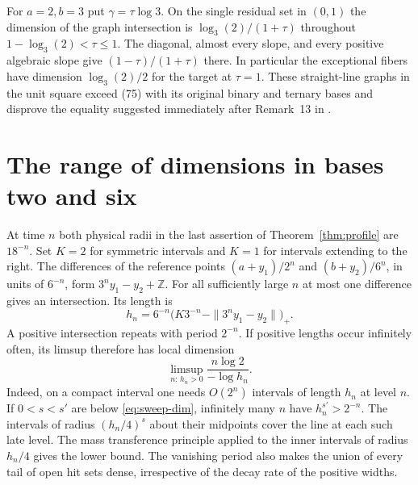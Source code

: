 \documentclass[11pt,reqno,a4paper]{amsart}
\theoremstyle{remark}
\numberwithin{equation}{section}
\begin{document}
For \(a=2,b=3\) put \(\gamma=\tau\log3\). On the single residual set
in \((0,1)\) the dimension of the graph intersection is
\(\log_3(2)/(1+\tau)\) throughout \(1-\log_3(2)<\tau\le1\).
The diagonal, almost every slope, and every positive algebraic slope
give \((1-\tau)/(1+\tau)\) there. In particular the exceptional
fibers have dimension \(\log_3(2)/2\) for the target at \(\tau=1\).
These straight-line graphs in the unit square exceed (75) with
its original binary and ternary bases and disprove the equality
suggested immediately after Remark~13 in \cite[\S5.5, pp.~67--68]{LLVZ}.

\section{The range of dimensions in bases two and six}\label{sec:sweep}
At time \(n\) both physical radii in the last assertion of Theorem~\ref{thm:profile} are \(18^{-n}\). Set \(K=2\) for symmetric intervals and \(K=1\) for intervals extending to the right. The differences of the reference points \((a+y_1)/2^n\) and \((b+y_2)/6^n\), in units of \(6^{-n}\), form \(3^ny_1-y_2+\mathbb Z\). For all sufficiently large \(n\) at most one difference gives an intersection. Its length is
\[
 h_n=6^{-n}\big(K3^{-n}-\|3^ny_1-y_2\|\big)_+.
\]
A positive intersection repeats with period \(2^{-n}\). If positive lengths occur infinitely often, its limsup therefore has local dimension
\begin{equation}\label{eq:sweep-dim}
 \limsup_{n:\, h_n>0}\frac{n\log2}{-\log h_n}.
\end{equation}
Indeed, on a compact interval one needs \(O(2^n)\) intervals of length \(h_n\) at level \(n\). If \(0<s<s'\) are below \eqref{eq:sweep-dim}, infinitely many \(n\) have \(h_n^{s'}>2^{-n}\). The intervals of radius \((h_n/4)^s\) about their midpoints cover the line at each such late level. The mass transference principle \cite[Theorem~2]{BV} applied to the inner intervals of radius \(h_n/4\) gives the lower bound. The vanishing period also makes the union of every tail of open hit sets dense, irrespective of the decay rate of the positive widths.
\end{document}
